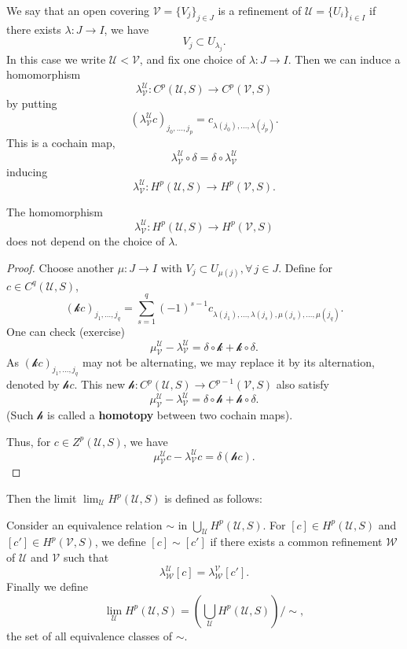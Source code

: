 \documentclass[12pt]{article}
\begin{document}
We say that an open covering \(\mathcal{V}=\{V_j\}_{j\in J}\) is a refinement of
\(\mathcal{U}=\{U_i\}_{i\in I}\) if there exists \(\lambda\colon J\to I\), we have \[
  V_j\subset U_{\lambda_j}
.\] In this case we write \(\mathcal{U}<\mathcal{V}\), and fix one choice of
\(\lambda\colon J\to I\). Then we can induce a homomorphism \[
  \lambda_{\mathcal{V}}^{\mathcal{U}}\colon C^p(\mathcal{U},S)\longrightarrow
  C^p(\mathcal{V},S)
\] by putting \[
  (\lambda_{\mathcal{V}}^{\mathcal{U}}c)_{j_0,\ldots,j_p}
  =c_{\lambda(j_0),\ldots,\lambda(j_p)}
.\] This is a cochain map, \ie\ \[
  \lambda_{\mathcal{V}}^{\mathcal{U}}\circ \delta
  =\delta\circ \lambda_{\mathcal{V}}^{\mathcal{U}}
\] inducing \[
  \lambda_{\mathcal{V}}^{\mathcal{U}}\colon H^p(\mathcal{U},S)\longrightarrow
  H^p(\mathcal{V},S)
.\] 

\begin{lemma}
  The homomorphism \[
    \lambda_{\mathcal{V}}^{\mathcal{U}}\colon H^p(\mathcal{U},S)\longrightarrow
    H^p(\mathcal{V},S)
  \] does not depend on the choice of \(\lambda\).
\end{lemma}
\begin{proof}
  Choose another \(\mu\colon J\to I\) with \(V_j\subset U_{\mu(j)},\forall\,j\in J\).
  Define for \(c\in C^q(\mathcal{U},S)\), \[
    (\mathcal{k}c)_{j_1,\ldots,j_q}=\sum_{s=1}^{q}(-1)^{s-1}
    c_{\lambda(j_1),\ldots,\lambda(j_s),\mu(j_s),\ldots,\mu(j_q)}
  .\] One can check (exercise) \[
    \mu_{\mathcal{V}}^{\mathcal{U}}-\lambda_{\mathcal{V}}^{\mathcal{U}}
    =\delta\circ \mathcal{k}+\mathcal{k}\circ \delta
  .\] As \((\mathcal{k}c)_{j_1,\ldots,j_q}\) may not be alternating, we may replace
  it by its alternation, denoted by \(\mathcal{h}c\). This new 
  \(\mathcal{h}\colon C^p(\mathcal{U},S)\to C^{p-1}(\mathcal{V},S)\) also satisfy \[
    \mu_{\mathcal{V}}^{\mathcal{U}}-\lambda_{\mathcal{V}}^{\mathcal{U}}
    =\delta\circ \mathcal{h}+\mathcal{h}\circ \delta
  .\] (Such \(\mathcal{h}\) is called a \textbf{homotopy} between two cochain maps).

  Thus, for \(c\in Z^p(\mathcal{U},S)\), we have \[
    \mu_{\mathcal{V}}^{\mathcal{U}}c-\lambda_{\mathcal{V}}^{\mathcal{U}}c
    =\delta(\mathcal{h}c)
  .\] 
\end{proof}
Then the limit \(\lim_{\mathcal{U}}H^{p}(\mathcal{U},S)\) is defined as follows:

Consider an equivalence relation \(\sim\) in \(\bigcup_{\mathcal{U}}H^p(\mathcal{U},S)
\). For \([c]\in H^p(\mathcal{U},S)\) and \([c']\in H^p(\mathcal{V},S)\), we define
\([c]\sim[c']\) if there exists a common refinement \(\mathcal{W}\) of \(\mathcal{U}\)
and \(\mathcal{V}\) such that \[
  \lambda_{\mathcal{W}}^{\mathcal{U}}[c]=\lambda_{\mathcal{W}}^{\mathcal{V}}[c']
.\] Finally we define \[
  \lim_{\mathcal{U}}H^p(\mathcal{U},S)=\left(\bigcup_{\mathcal{U}}H^p(\mathcal{U},S)
  \right)\bigg/\sim,
\] the set of all equivalence classes of \(\sim\).
\end{document}
